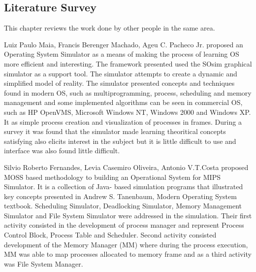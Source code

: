 \begin{onehalfspacing}
\chapter{Literature Survey}
\par This chapter reviews the work done by other people in the same area.\newline

\par Luiz Paulo Maia, Francis Berenger Machado, Ageu C. Pacheco Jr. \cite{Luiz} proposed an Operating System Simulator as a means of making the process of learning OS more efficient and interesting. The framework presented used the SOsim graphical simulator as a support tool. The simulator attempts to create a dynamic and simplified model of reality. The simulator  presented  concepts and techniques found in modern OS, such as multiprogramming, process, scheduling and memory management and some implemented algorithms can be seen in commercial OS, such as HP OpenVMS, Microsoft Windows NT, Windows 2000 and Windows XP. It as simple process creation and visualization of processes in frames. During a survey it was found that the simulator made learning theoritical concepts satisfying also elicits interest in the subject but it is little difficult to use and interface was also found little difficult.\newline

\par Silvio Roberto Fernandes, Levia Casemiro Oliveira, Antonio V.T.Costa \cite{Silvio}proposed MOSS based methodology to building an Operational System for MIPS Simulator. It is a collection of Java- based simulation programs that illustrated key concepts presented in Andrew S. Tanenbaum, Modern Operating System textbook. Scheduling Simulator, Deadlocking Simulator, Memory Management Simulator and File System Simulator were addressed in the simulation. Their first activity consisted in the development of process manager and represent Process Control Block, Process Table and Scheduler. Second activity consisted development of the Memory Manager (MM) where during the process execution, MM was able to map processes allocated to memory frame and as a third activity was File System Manager.\newline


\end{onehalfspacing}
